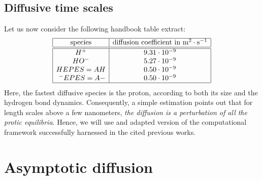 \documentclass[aps,11pt]{revtex4}
\begin{document}
\subsection{Diffusive time scales}
Let us now consider the following handbook table extract:
\begin{equation}
\label{tab:diff}
\begin{array}{|c|c|}
\hline
\text{species} & \text{diffusion coefficient in } \text{m}^2\cdot\text{s}^{-1} \\
\hline
\hline
H^+     & 9.31 \cdot 10^{-9} \\
HO^-    & 5.27 \cdot 10^{-9} \\
 HEPES=AH  &   0.50 \cdot 10^{-9}\\
~^-EPES=A- &   0.50 \cdot 10^{-9}\\
\hline
\end{array}
\end{equation}
Here, the fastest diffusive species is the proton, according to both its size and the hydrogen bond dynamics.
Consequently, a simple estimation points out that for length scales above a few nanometers, \textit{the diffusion is a perturbation of all the protic equilibria}.
Hence, we will use and adapted version of the computational framework successfully harnessed in the cited previous works.

\section{Asymptotic diffusion}
\end{document}
